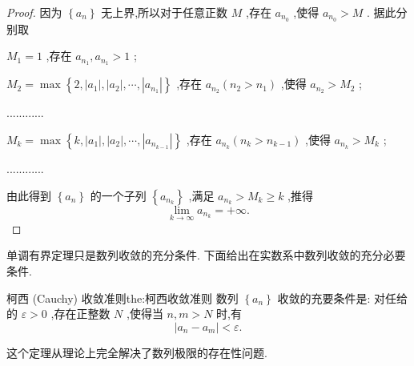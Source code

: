 \begin{proof}
因为 \(\left\{  {a}_{n}\right\}\) 无上界,所以对于任意正数 \(M\) ,存在 \({a}_{{n}_{0}}\) ,使得 \({a}_{{n}_{0}} > M\) . 据此分别取

\({M}_{1} = 1\) ,存在 \({a}_{{n}_{1}},{a}_{{n}_{1}} > 1\) ;

\({M}_{2} = \max \left\{  {2,\left| {a}_{1}\right| ,\left| {a}_{2}\right| ,\cdots ,\left| {a}_{{n}_{1}}\right| }\right\}\) ,存在 \({a}_{{n}_{2}}\left( {{n}_{2} > {n}_{1}}\right)\) ,使得 \({a}_{{n}_{2}} > {M}_{2}\) ;

............

\({M}_{k} = \max \left\{  {k,\left| {a}_{1}\right| ,\left| {a}_{2}\right| ,\cdots ,\left| {a}_{{n}_{k - 1}}\right| }\right\}\) ,存在 \({a}_{{n}_{k}}\left( {{n}_{k} > {n}_{k - 1}}\right)\) ,使得 \({a}_{{n}_{k}} > {M}_{k}\) ;

............

由此得到 \(\left\{  {a}_{n}\right\}\) 的一个子列 \(\left\{  {a}_{{n}_{k}}\right\}\) ,满足 \({a}_{{n}_{k}} > {M}_{k} \geq  k\) ,推得
\[
\mathop{\lim }\limits_{{k \rightarrow  \infty }}{a}_{{n}_{k}} =  + \infty .
\]
\end{proof}


单调有界定理只是数列收敛的充分条件. 下面给出在实数系中数列收敛的充分必要条件.

\begin{theorem}{柯西 (Cauchy) 收敛准则}{the:柯西收敛准则}
数列 \(\left\{  {a}_{n}\right\}\) 收敛的充要条件是: 对任给的 \(\varepsilon  > 0\) ,存在正整数 \(N\) ,使得当 \(n,m > N\) 时,有
\[
\left| {{a}_{n} - {a}_{m}}\right|  < \varepsilon .
\]
\end{theorem}

这个定理从理论上完全解决了数列极限的存在性问题.

